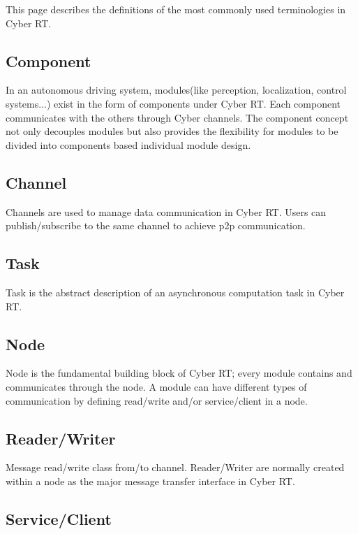 This page describes the definitions of the most commonly used terminologies in Cyber R\-T.

\subsection*{Component}

In an autonomous driving system, modules(like perception, localization, control systems...) exist in the form of components under Cyber R\-T. Each component communicates with the others through Cyber channels. The component concept not only decouples modules but also provides the flexibility for modules to be divided into components based individual module design.

\subsection*{Channel}

Channels are used to manage data communication in Cyber R\-T. Users can publish/subscribe to the same channel to achieve p2p communication.

\subsection*{Task}

Task is the abstract description of an asynchronous computation task in Cyber R\-T.

\subsection*{Node}

Node is the fundamental building block of Cyber R\-T; every module contains and communicates through the node. A module can have different types of communication by defining read/write and/or service/client in a node.

\subsection*{Reader/\-Writer}

Message read/write class from/to channel. Reader/\-Writer are normally created within a node as the major message transfer interface in Cyber R\-T.

\subsection*{Service/\-Client}

